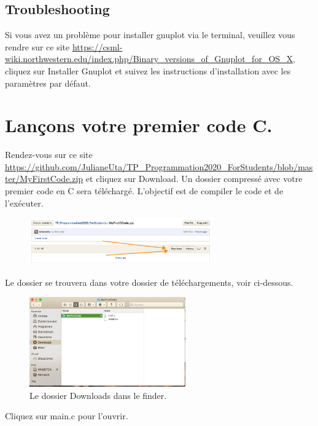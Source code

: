 \documentclass{article}
\begin{document}
\subsection{Troubleshooting\label{S:GnuplotTrouble}}
Si vous avez un problème pour installer gnuplot via le terminal, veuillez vous rendre sur ce site \href{https://csml-wiki.northwestern.edu/index.php/Binary_versions_of_Gnuplot_for_OS_X}{https://csml-wiki.northwestern.edu/index.php/Binary\_versions\_of\_Gnuplot\_for\_OS\_X}, cliquez sur Installer Gnuplot et suivez les instructions d'installation avec les paramètres par défaut.


\section{Lançons votre premier code C.}
Rendez-vous sur ce site \href{https://github.com/JulianeUta/TP_Programmation2020_ForStudents/blob/master/MyFirstCode.zip}{https://github.com/JulianeUta/TP\_Programmation2020\_ForStudents/blob/master/MyFirstCode.zip} et cliquez sur Download. Un dossier compressé avec votre premier code en C sera téléchargé. L'objectif est de compiler le code et de l'exécuter.
\begin{figure}[H]
\center
\includegraphics[width=0.7\textwidth]{Plots/FirstCode_1.png}
\end{figure}
Le dossier se trouvera dans votre dossier de téléchargements, voir ci-dessous.
\begin{figure}[H]
\center
\includegraphics[width=0.6\textwidth]{Plots/DownloadMyFirstCode.png}
\caption{Le dossier Downloads dans le finder.\label{F:locationMyFirstCode}}
\end{figure}
Cliquez sur main.c pour l'ouvrir. 
\end{document}
